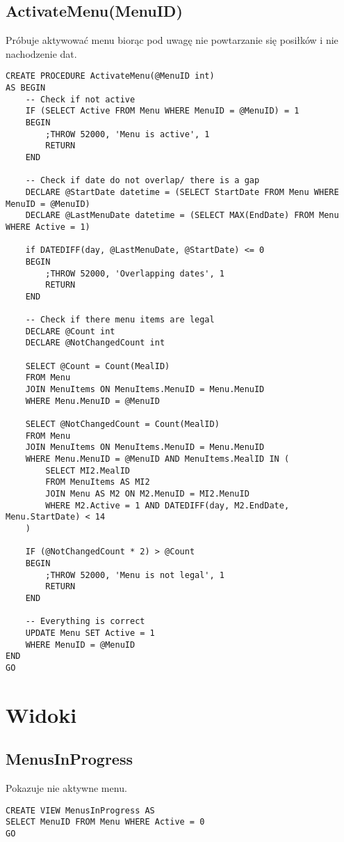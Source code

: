 \subsection{ActivateMenu(MenuID)}
Próbuje aktywować menu biorąc pod uwagę nie powtarzanie się posiłków i nie nachodzenie dat.
\begin{verbatim}
CREATE PROCEDURE ActivateMenu(@MenuID int)
AS BEGIN
    -- Check if not active
    IF (SELECT Active FROM Menu WHERE MenuID = @MenuID) = 1
    BEGIN
        ;THROW 52000, 'Menu is active', 1
        RETURN
    END

    -- Check if date do not overlap/ there is a gap
    DECLARE @StartDate datetime = (SELECT StartDate FROM Menu WHERE MenuID = @MenuID)
    DECLARE @LastMenuDate datetime = (SELECT MAX(EndDate) FROM Menu WHERE Active = 1)
    
    if DATEDIFF(day, @LastMenuDate, @StartDate) <= 0
    BEGIN
        ;THROW 52000, 'Overlapping dates', 1
        RETURN
    END

    -- Check if there menu items are legal
    DECLARE @Count int
    DECLARE @NotChangedCount int

    SELECT @Count = Count(MealID)
    FROM Menu
    JOIN MenuItems ON MenuItems.MenuID = Menu.MenuID
    WHERE Menu.MenuID = @MenuID

    SELECT @NotChangedCount = Count(MealID)
    FROM Menu 
    JOIN MenuItems ON MenuItems.MenuID = Menu.MenuID
    WHERE Menu.MenuID = @MenuID AND MenuItems.MealID IN (
        SELECT MI2.MealID
        FROM MenuItems AS MI2
        JOIN Menu AS M2 ON M2.MenuID = MI2.MenuID
        WHERE M2.Active = 1 AND DATEDIFF(day, M2.EndDate, Menu.StartDate) < 14
    )

    IF (@NotChangedCount * 2) > @Count
    BEGIN
        ;THROW 52000, 'Menu is not legal', 1
        RETURN
    END

    -- Everything is correct
    UPDATE Menu SET Active = 1
    WHERE MenuID = @MenuID
END
GO
\end{verbatim}
\section{Widoki}
\subsection{MenusInProgress}
Pokazuje nie aktywne menu.
\begin{verbatim}
CREATE VIEW MenusInProgress AS
SELECT MenuID FROM Menu WHERE Active = 0
GO
\end{verbatim}
